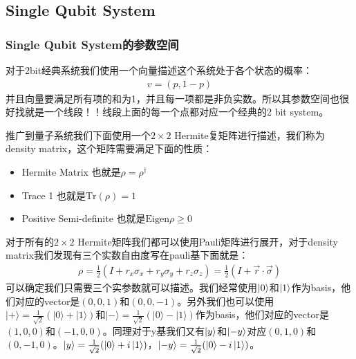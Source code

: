 \subsection{Single Qubit System}

\subsubsection{Single Qubit System的参数空间}

对于2bit经典系统我们使用一个向量描述这个系统处于各个状态的概率：
\begin{align}
  v = (p, 1-p)
\end{align}
并且向量要满足所有项的和为1，并且每一项都是非负实数。所以其参数空间也很好找就是一个线段！！线段上面的每一个点都对应一个经典的2 bit system。

\bigskip
{}

推广到量子系统我们下面使用一个$ 2 \times 2 $ Hermite复矩阵进行描述，我们称为density matrix，这个矩阵需要满足下面的性质：
\begin{itemize}
  \item Hermite Matrix 也就是$ \rho = \rho^\dagger $
  \item Trace 1 也就是$ \mathrm{Tr}(\rho)=1 $
  \item Positive Semi-definite 也就是$ \text{Eigen} \rho \geq 0 $
\end{itemize}

\bigskip
{}

对于所有的$ 2 \times 2 $ Hermite矩阵我们都可以使用Pauli矩阵进行展开，对于density
matrix我们发现有三个实数自由度写在pauli基下面就是：
\begin{align}
  \rho = \frac{1}{2}(I + r_x \sigma_x + r_y \sigma_y + r_z \sigma_z)
  = \frac{1}{2}(I + \vec{r} \cdot \vec{\sigma})
\end{align}
可以确定我们只需要三个实参数就可以描述。我们经常使用$ \left| 0 \right\rangle $和$ \left| 1 \right\rangle
$作为basis，他们对应的vector是$ (0,0,1) $和$ (0,0,-1) $。另外我们也可以使用$ |+\rangle =
\frac{1}{\sqrt{2}}(|0\rangle + |1\rangle) $和$ |-\rangle =
\frac{1}{\sqrt{2}}(|0\rangle - |1\rangle) $作为basis，他们对应的vector是$
(1,0,0) $和$ (-1,0,0) $。同理对于y基我们又有$ \left| y \right\rangle $和$ \left| -y \right\rangle $对应$ (0,1,0)
$和$ (0,-1,0) $。$ \left| y \right\rangle = \frac{1}{\sqrt{2}}(\left| 0 \right\rangle + i \left| 1 \right\rangle)
$，$ \left| -y \right\rangle = \frac{1}{\sqrt{2}}(\left| 0 \right\rangle - i \left| 1 \right\rangle) $。


